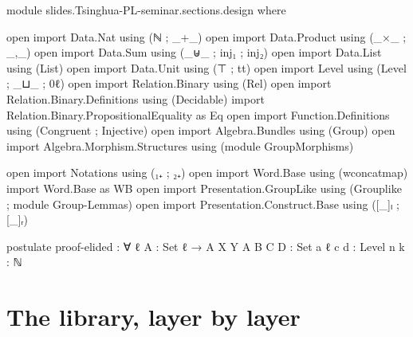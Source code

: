 \begin{code}[hide]
module slides.Tsinghua-PL-seminar.sections.design where

open import Data.Nat using (ℕ ; _+_)
open import Data.Product using (_×_ ; _,_)
open import Data.Sum using (_⊎_ ; inj₁ ; inj₂)
open import Data.List using (List)
open import Data.Unit using (⊤ ; tt)
open import Level using (Level ; _⊔_ ; 0ℓ)
open import Relation.Binary using (Rel)
open import Relation.Binary.Definitions using (Decidable)
import Relation.Binary.PropositionalEquality as Eq
open import Function.Definitions using (Congruent ; Injective)
open import Algebra.Bundles using (Group)
open import Algebra.Morphism.Structures using (module GroupMorphisms)

open import Notations using (₁₊ ; ₂₊)
open import Word.Base using (wconcatmap)
import Word.Base as WB
open import Presentation.GroupLike using (Grouplike ; module Group-Lemmas)
open import Presentation.Construct.Base using ([_]ₗ ; [_]ᵣ)

postulate
  proof-elided : ∀ {ℓ} {A : Set ℓ} → A
  X Y A B C D  : Set
  a ℓ c d      : Level
  n k          : ℕ
\end{code}
\PaperPart
\section{The library, layer by layer}

